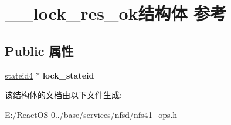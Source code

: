 \hypertarget{struct____lock__res__ok}{}\section{\+\_\+\+\_\+lock\+\_\+res\+\_\+ok结构体 参考}
\label{struct____lock__res__ok}
\subsection*{Public 属性}
\begin{DoxyCompactItemize}
\item 
\mbox{\label{struct____lock__res__ok_a44a3aa576729f7ccc5f2e4f12d446ea3}} 
\hyperlink{struct____stateid4}{stateid4} $\ast$ {\bfseries lock\+\_\+stateid}
\end{DoxyCompactItemize}


该结构体的文档由以下文件生成\+:\begin{DoxyCompactItemize}
\item 
E\+:/\+React\+O\+S-\/0../base/services/nfsd/nfs41\+\_\+ops.\+h\end{DoxyCompactItemize}

